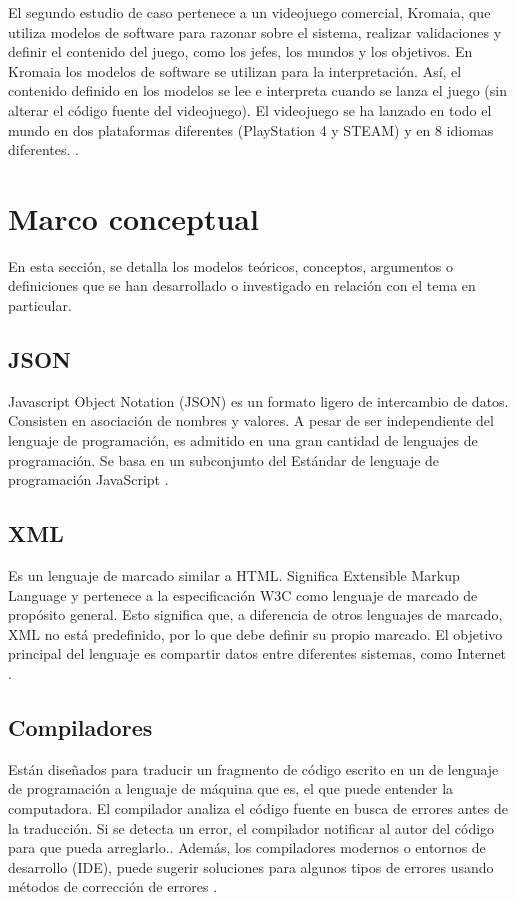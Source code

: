 El segundo estudio de caso pertenece a un videojuego comercial, Kromaia, que utiliza modelos de software para razonar sobre el sistema, realizar validaciones y definir el contenido del juego, como los jefes, los mundos y los objetivos. En Kromaia los modelos de software se utilizan para la interpretación. Así, el contenido definido en los modelos se lee e interpreta cuando se lanza el juego (sin alterar el código fuente del videojuego). El videojuego se ha lanzado en todo el mundo en dos plataformas diferentes (PlayStation 4 y STEAM) y en 8 idiomas diferentes. \cite{Topic}.

\section{Marco conceptual}

	En esta sección, se detalla los modelos teóricos, conceptos, argumentos o definiciones que se han desarrollado o investigado en relación con el tema en particular.

\subsection{JSON}

Javascript Object Notation (JSON) es un formato ligero de intercambio de datos. Consisten en asociación de nombres y valores. A pesar de ser independiente del lenguaje de programación, es admitido en una gran cantidad de lenguajes de programación. Se basa en un subconjunto del Estándar de lenguaje de programación JavaScript \cite{JSON}.

\subsection{XML}

Es un lenguaje de marcado similar a HTML. Significa Extensible Markup Language y pertenece a la especificación W3C como lenguaje de marcado de propósito general. Esto significa que, a diferencia de otros lenguajes de marcado, XML no está predefinido, por lo que debe definir su propio marcado. El objetivo principal del lenguaje es compartir datos entre diferentes sistemas, como Internet \cite{XML-based}.

\subsection{Compiladores}
Están diseñados para traducir un fragmento de código escrito en un de lenguaje de programación a lenguaje de máquina que es, el que puede entender la computadora. El compilador analiza el código fuente en busca de errores antes de la traducción. Si se detecta un error, el compilador
notificar al autor del código para que pueda arreglarlo.. Además, los compiladores modernos o entornos de desarrollo (IDE), puede sugerir soluciones para algunos tipos de errores usando métodos de corrección de errores \cite{CoEdit}.

